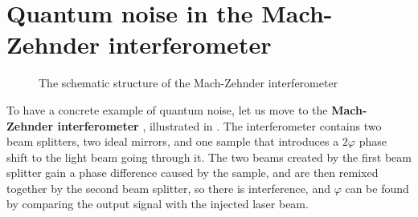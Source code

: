 \documentclass[hyperref, a4paper]{article}
\newcommand*{\concept}[1]{{\textbf{#1}}}
\begin{document}
\section{Quantum noise in the Mach-Zehnder interferometer}\label{sec:interferometer}

\begin{figure}
    \centering
    
    \caption{The schematic structure of the Mach-Zehnder interferometer}
    \label{fig:mz-inter}
\end{figure}

To have a concrete example of quantum noise, 
let us move to the \concept{Mach-Zehnder interferometer} \cite{caves_quantum-mechanical_1981},
illustrated in .
The interferometer contains two beam splitters, 
two ideal mirrors, 
and one sample that introduces a $2\varphi$ phase shift to the light beam going through it.
The two beams created by the first beam splitter gain a phase difference caused by the sample,
and are then remixed together by the second beam splitter,
so there is interference,
and $\varphi$ can be found by comparing the output signal with the injected laser beam.
\end{document}
